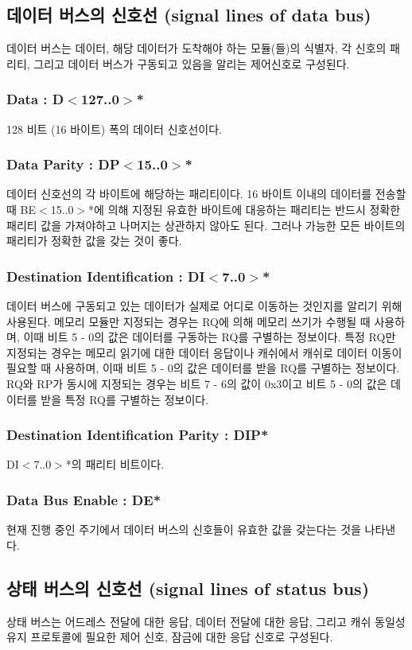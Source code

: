 \subsection{데이터 버스의 신호선 (signal lines of data bus)}
데이터 버스는 데이터, 해당 데이터가 도착해야 하는 모듈(들)의 식별자,
각 신호의 패리티, 그리고 데이터 버스가 구동되고 있음을 알리는 제어신호로
구성된다.
\subsubsection{Data : D$<$127..0$>$*}
128 비트 (16 바이트) 폭의 데이터 신호선이다.
%
\subsubsection{Data Parity : DP$<$15..0$>$*}
데이터 신호선의 각 바이트에 해당하는 패리티이다. 16 바이트 이내의 데이터를
전송할 때 BE$<$15..0$>$*에 의해 지정된 유효한 바이트에 대응하는 패리티는
반드시 정확한 패리티 값을 가져야하고 나머지는 상관하지 않아도 된다.
그러나 가능한 모든 바이트의 패리티가 정확한 값을 갖는 것이 좋다.

%
\subsubsection{Destination Identification : DI$<$7..0$>$*}
데이터 버스에 구동되고 있는 데이터가 실제로 어디로 이동하는 것인지를 알리기 위해 사용된다.
메모리 모듈만 지정되는 경우는 RQ에 의해 메모리 쓰기가 수행될 때 사용하며,
이때 비트 5 - 0의 값은 데이터를 구동하는 RQ를 구별하는 정보이다.
특정 RQ만 지정되는 경우는 메모리 읽기에 대한 데이터 응답이나
캐쉬에서 캐쉬로 데이터 이동이 필요할 때 사용하며,
이때 비트 5 - 0의 값은 데이터를 받을 RQ를 구별하는 정보이다.
RQ와 RP가 동시에 지정되는 경우는
비트 7 - 6의 값이 0x3이고 비트 5 - 0의 값은 데이터를 받을 특정 RQ를 구별하는
정보이다.

%
\subsubsection{Destination Identification Parity : DIP*}
DI$<$7..0$>$*의 패리티 비트이다.
%
\subsubsection{Data Bus Enable : DE*}
현재 진행 중인 주기에서 데이터 버스의 신호들이 유효한 값을 갖는다는 것을 나타낸다.
%
\subsection{상태 버스의 신호선 (signal lines of status bus)}
상태 버스는 어드레스 전달에 대한 응답, 데이터 전달에 대한 응답, 그리고 캐쉬 동일성 유지
프로토콜에 필요한 제어 신호, 잠금에 대한 응답 신호로 구성된다.
%
